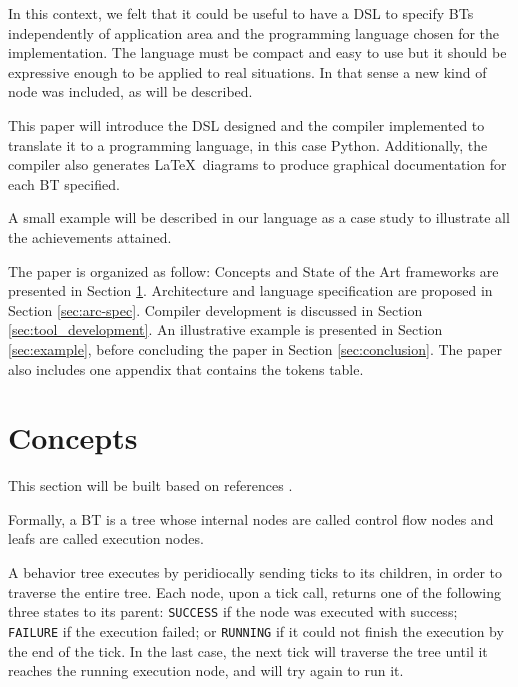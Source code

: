 \documentclass[a4paper,UKenglish,cleveref, autoref, thm-restate]{oasics-v2019}
\begin{document}
In this context, we felt that it could be useful to have a DSL to specify BTs independently of application area and the programming language chosen for the implementation.
The language must be compact and easy to use but it should be expressive enough to be applied to real situations.
In that sense a new kind of node was included, as will be described.

This paper will introduce the DSL designed and the compiler implemented to translate it to a programming language, in this case Python.
Additionally, the compiler also generates \LaTeX\ diagrams to produce graphical documentation for each BT specified.

A small example will be described in our language as a case study to illustrate all the achievements attained.

The paper is organized as follow: Concepts and State of the Art frameworks are presented in Section \ref{sec:concepts}.
Architecture and language specification are proposed in Section \ref{sec:arc-spec}.
Compiler development is discussed in Section \ref{sec:tool_development}.
An illustrative example is presented in Section \ref{sec:example},
before concluding the paper in Section \ref{sec:conclusion}.
The paper also includes one appendix that contains the tokens table.

\section{Concepts}
\label{sec:concepts}

This section will be built based on references \cite{ColOgr2018,Simpson2014,MilFunge2009}.

Formally, a BT is a tree whose internal nodes are called control flow nodes and leafs are called execution nodes.

A behavior tree executes by peridiocally sending ticks to its children, in order to traverse the entire tree.
Each node, upon a tick call, returns one of the following three states to its parent: \texttt{SUCCESS} if the node was executed with success; \texttt{FAILURE} if the execution failed; or \texttt{RUNNING} if it could not finish the execution by the end of the tick.
In the last case, the next tick will traverse the tree until it reaches the running execution node, and will try again to run it.
\end{document}
